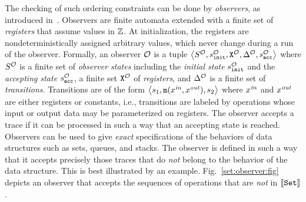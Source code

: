 The checking of such ordering constraints can be done by 
{\em observers}, 
as introduced in~\cite{AHHR:integrated}. 
%
Observers are
finite automata extended with a finite set of {\em registers}
that assume values in ${\mathbb Z}$. 
%
%
At initialization,
the registers are nondeterministically
assigned arbitrary values, which never change
during a run of the observer. 
%
Formally, an observer ${\mathcal O}$ is a tuple
$\left\langle S^{\mathcal O},s^{\mathcal O}_{\tt init},{\tt X}^{{\mathcal O}},\Delta^{\mathcal O},s^{\mathcal O}_{\tt acc}\right\rangle$ where $S^{\mathcal O}$ is a finite set 
of {\it observer states} including the 
{\it initial state} $s^{\mathcal O}_{\tt init}$ and
the {\it accepting state} $s^{\mathcal O}_{\tt acc}$, 
a finite set ${\tt X}^{{\mathcal O}}$  
of {\it registers}, and $\Delta^{\mathcal O}$ is a finite
set of {\it transitions}.
%
%
Transitions are of the form 
$\left\langle s_1,{\tt m}(x^{\it in},x^{\it out}),s_2\right\rangle$ where 
$x^{\it in}$ and $x^{\it out}$ are either registers or constants, i.e.,
transitions are labeled by 
operations whose input or output data may be parameterized on registers.
%
%
The observer accepts a trace if it can  be processed in such a way that
an accepting state is reached.
%
Observers can be used to give {\it exact} specifications of
the behaviors of data structures such as sets, queues, and stacks.
%
The observer is defined in such a way that it accepts precisely those
traces that do {\em not} belong to the behavior
of the data structure.
%
This is best illustrated by an example. Fig.~\ref{set:observer:fig}
depicts an observer that accepts the
sequences of operations that are {\em not} in $\left\llbracket{\tt Set}\right\rrbracket$.
%











